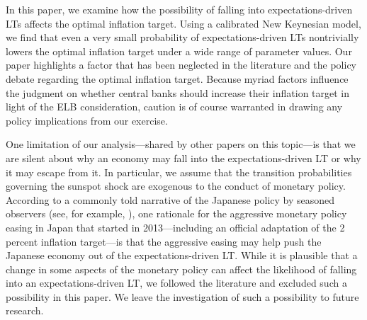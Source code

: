 \documentclass[11pt]{article}
\begin{document}
	In this paper, we examine how the possibility of falling into expectations-driven LTs affects the optimal inflation target. Using a calibrated New Keynesian model, we find that even a very small probability of expectations-driven LTs nontrivially lowers the optimal inflation target under a wide range of parameter values. Our paper highlights a factor that has been neglected in the literature and the policy debate regarding the optimal inflation target. Because myriad factors influence the judgment on whether central banks should increase their inflation target in light of the ELB consideration, caution is of course warranted in drawing any policy implications from our exercise.

	One limitation of our analysis---shared by other papers on this topic---is that we are silent about why an economy may fall into the expectations-driven LT or why it may escape from it. In particular, we assume that the transition probabilities governing the sunspot shock are exogenous to the conduct of monetary policy. According to a commonly told narrative of the Japanese policy by seasoned observers (see, for example, \citet{Hayakawa2016Book}), one rationale for the aggressive monetary policy easing in Japan that started in 2013---including an official adaptation of the 2 percent inflation target---is that the aggressive easing may help push the Japanese economy out of the expectations-driven LT. While it is plausible that a change in some aspects of the monetary policy can affect the likelihood of falling into an expectations-driven LT, we followed the literature and excluded such a possibility in this paper. We leave the investigation of such a possibility to future research.


	\newpage
	
	
\end{document}
